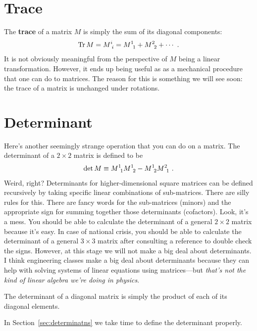 \documentclass[12pt, oneside]{report}    %
\let\oldsection\section
\def\section{%
  \setcounter{sidenote}{1}%
  \oldsection
}
\begin{document}
\begin{subappendices}
\section{Trace}

The \textbf{trace} of a matrix $M$ is simply the sum of its diagonal components:
\begin{align}
    \Tr M = M\aij{i}{i} = M\aij{1}{1} + M\aij{2}{2} + \cdots \ .
\end{align}
It is not obviously meaningful from the perspective of $M$ being a linear transformation. However, it ends up being useful as as a mechanical procedure that one can do to matrices. The reason for this is something we will see soon: the trace of a matrix is unchanged under rotations. 

\section{Determinant}
\label{sec:determinants:easy}


Here's another seemingly strange operation that you can do on a matrix. The determinant of a $2\times 2$ matrix is defined to be
\begin{align}
    \det M \equiv M\aij11 M\aij12 - M\aij12 M\aij21 \ .
\end{align}
Weird, right? Determinants for higher-dimensional square matrices can be defined recursively by taking specific linear combinations of sub-matrices. There are silly rules for this. There are fancy words for the sub-matrices (minors) and the appropriate sign for summing together those determinants (cofactors). Look, it's a mess. You should be able to calculate the determinant of a general $2\times 2$ matrix because it's easy. In case of national crisis, you should be able to calculate the determinant of a general $3\times 3$ matrix after consulting a reference to double check the signs. However, at this stage we will not make a big deal about determinants. I think engineering classes make a big deal about determinants because they can help with solving systems of linear equations using matrices---but \emph{that's not the kind of linear algebra we're doing in physics}.

\begin{example}\label{eg:determinant:of:diagonal}
The determinant of a diagonal matrix is simply the product of each of its diagonal elements. 
\end{example}

In Section~\ref{sec:determinatns} we take time to define the determinant properly. 


\end{subappendices}
\end{document}
